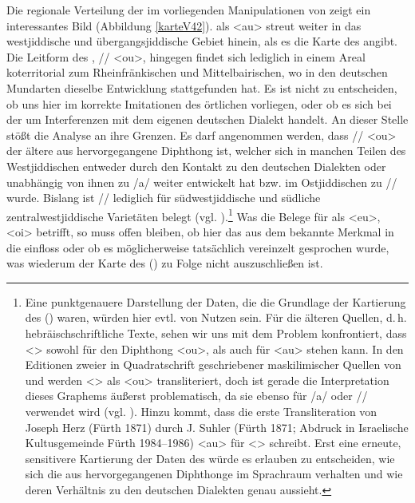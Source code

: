 Die regionale Verteilung der im  vorliegenden Manipulationen von  zeigt ein interessantes Bild (Abbildung \ref{karteV42}).  als <au> streut weiter in das westjiddische und übergangsjiddische Gebiet hinein, als es die Karte des  \textcite[79]{Herzog1992} angibt. Die Leitform des ,  /\textopeno {}/ <ou>, hingegen findet sich lediglich in einem Areal koterritorial zum Rheinfränkischen und Mittelbairischen, wo in den deutschen Mundarten dieselbe Entwicklung stattgefunden hat. Es ist nicht zu entscheiden, ob uns hier im  korrekte Imitationen des örtlichen  vorliegen, oder ob es sich bei der  um Interferenzen mit dem eigenen deutschen Dialekt handelt. An dieser Stelle stößt die Analyse an ihre Grenzen. Es darf angenommen werden, dass /\textopeno {}/ <ou> der ältere aus  hervorgegangene Diphthong ist, welcher sich in manchen Teilen des Westjiddischen entweder durch den Kontakt zu den deutschen Dialekten oder unabhängig von ihnen zu /a/ weiter entwickelt hat bzw. im Ostjiddischen zu /\textopeno {}/ wurde. Bislang ist /\textopeno {}/ lediglich für südwestjiddische und südliche zentralwestjiddische Varietäten belegt (vgl. \cite[58f]{GuggenheimGruenberg1973}).\footnote{Eine punktgenauere Darstellung der Daten, die die Grundlage der Kartierung des  (\citeyear[79]{Herzog1992}) waren, würden hier evtl. von Nutzen sein. Für die älteren Quellen, d.\,h. hebräischschriftliche Texte, sehen wir uns mit dem Problem konfrontiert, dass <> sowohl für den Diphthong <ou>, als auch für <au> stehen kann. In den Editionen zweier in Quadratschrift geschriebener maskilimischer Quellen von \textcite{AptrootGruschka2004} und \textcite{copeland1976} werden <> als <ou> transliteriert, doch ist gerade die Interpretation dieses Graphems äußerst problematisch, da sie ebenso für /a/ oder  /\textopeno \textsubarch{\textsci}/ verwendet wird  (vgl. \cite[167]{Timm1987}). Hinzu kommt, dass die erste Transliteration von Joseph Herz  (Fürth 1871) durch J. Suhler (Fürth 1871; Abdruck in Israelische Kultusgemeinde Fürth 1984–1986) <au> für <> schreibt. Erst eine erneute, sensitivere Kartierung der Daten des  würde es erlauben zu entscheiden, wie sich die aus  hervorgegangenen Diphthonge im  Sprachraum verhalten und wie deren Verhältnis zu den deutschen Dialekten genau aussieht.} Was die Belege für  als <eu>, <oi> betrifft, so muss offen bleiben, ob hier das aus dem  bekannte Merkmal in die  einfloss oder ob es möglicherweise tatsächlich vereinzelt gesprochen wurde, was wiederum der Karte des  (\cite[79]{Herzog1992}) zu Folge nicht auszuschließen ist. \\
 
